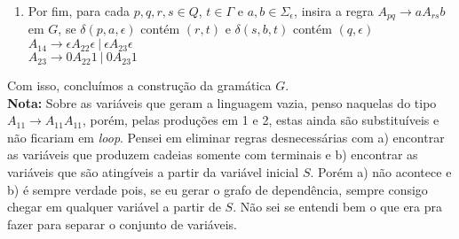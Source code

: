 \begin{enumerate}[label={\textbf{\arabic*.}}]
    \item Por fim, para cada $p, q, r, s \in Q$, $t \in \Gamma$ e $a, b \in \Sigma_\epsilon$, insira a regra $A_{pq} \rightarrow aA_{rs}b$ em $G$, se $\delta(p, a, \epsilon)$ contém $(r, t)$ e $\delta(s, b, t)$ contém $(q, \epsilon)$\\[2pt]
    $A_{14} \rightarrow \epsilon A_{22} \epsilon\ |\ \epsilon A_{23} \epsilon$\\
    $A_{23} \rightarrow 0A_{22}1\ |\ 0A_{23}1$
\end{enumerate}

Com isso, concluímos a construção da gramática $G$.\\[3pt]
\textbf{Nota: } Sobre as variáveis que geram a linguagem vazia, penso naquelas do tipo $A_{11} \rightarrow A_{11}A_{11}$, porém, pelas produções em 1 e 2, estas ainda são substituíveis e não ficariam em \textit{loop}. Pensei em eliminar regras desnecessárias com a) encontrar as variáveis que produzem cadeias somente com terminais e b) encontrar as variáveis que são atingíveis a partir da variável inicial $S$. Porém a) não acontece e b) é sempre verdade pois, se eu gerar o grafo de dependência, sempre consigo chegar em qualquer variável a partir de $S$. Não sei se entendi bem o que era pra fazer para separar o conjunto de variáveis.\\[6pt]